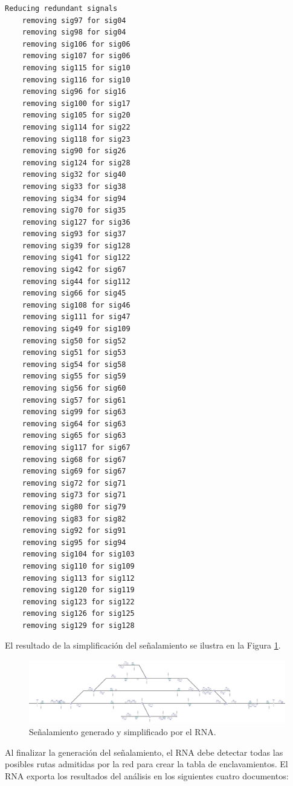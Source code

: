 \begin{lstlisting}[language = {}, tabsize=4, basicstyle=\footnotesize\ttfamily, showspaces=false, showstringspaces=false, caption = Reducción de señalamiento por prioridad de señales, label = {lst:EJ4_3}]
	Reducing redundant signals
	removing sig97 for sig04
	removing sig98 for sig04
	removing sig106 for sig06
	removing sig107 for sig06
	removing sig115 for sig10
	removing sig116 for sig10
	removing sig96 for sig16
	removing sig100 for sig17
	removing sig105 for sig20
	removing sig114 for sig22
	removing sig118 for sig23
	removing sig90 for sig26
	removing sig124 for sig28
	removing sig32 for sig40
	removing sig33 for sig38
	removing sig34 for sig94
	removing sig70 for sig35
	removing sig127 for sig36
	removing sig93 for sig37
	removing sig39 for sig128
	removing sig41 for sig122
	removing sig42 for sig67
	removing sig44 for sig112
	removing sig66 for sig45
	removing sig108 for sig46
	removing sig111 for sig47
	removing sig49 for sig109
	removing sig50 for sig52
	removing sig51 for sig53
	removing sig54 for sig58
	removing sig55 for sig59
	removing sig56 for sig60
	removing sig57 for sig61
	removing sig99 for sig63
	removing sig64 for sig63
	removing sig65 for sig63
	removing sig117 for sig67
	removing sig68 for sig67
	removing sig69 for sig67
	removing sig72 for sig71
	removing sig73 for sig71
	removing sig80 for sig79
	removing sig83 for sig82
	removing sig92 for sig91
	removing sig95 for sig94
	removing sig104 for sig103
	removing sig110 for sig109
	removing sig113 for sig112
	removing sig120 for sig119
	removing sig123 for sig122
	removing sig126 for sig125
	removing sig129 for sig128
\end{lstlisting}

El resultado de la simplificación del señalamiento se ilustra en la Figura \ref{fig:EJ4_7}.

\begin{figure}[H]
	\centering
	\includegraphics[width=1\textwidth]{resultados-obtenidos/ejemplo4/images/4_RNA.png}
	\centering\caption{Señalamiento generado y simplificado por el RNA.}
	\label{fig:EJ4_7}
\end{figure}

Al finalizar la generación del señalamiento, el RNA debe detectar todas las posibles rutas admitidas por la red para crear la tabla de enclavamientos. El RNA exporta los resultados del análisis en los siguientes cuatro documentos:

